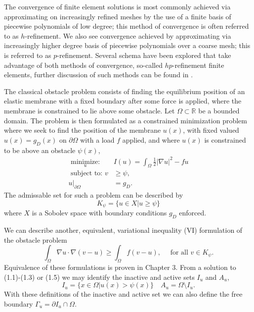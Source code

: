 \documentclass[12 pt]{report}
\newcommand{\RR}{\mathbb{R}}
\newcommand{\abs}[1]{\left| #1 \right|}
\begin{document}
The convergence of finite element solutions is most commonly achieved via approximating on increasingly refined meshes by the use of a finite basis of piecewise polynomials of low degree; this method of convergence is often referred to as $h$-refinement. We also see convergence achieved by approximating via increasingly higher degree basis of piecewise polynomials over a coarse mesh; this is referred to as $p$-refinement. Several schema have been explored that take advantage of both methods of convergence, so-called $hp$-refinement finite elements, further discussion of such methods can be found in \citet{demkowicz_computing_2007}.


The classical obstacle problem consists of finding the equilibrium position of an elastic membrane with a fixed boundary after some force is applied, where the membrane is constrained to lie above some obstacle. Let $\Omega \subset \RR$ be a bounded domain. The problem is then formulated as a constrained minimization problem where we seek to find the position of the membrane $u(x)$, with fixed valued $u(x) = g_D(x)$ on $\partial \Omega$ with a load $f$ applied, and where $u(x)$ is constrained to be above an obstacle $\psi(x)$, 
\begin{align}
    \underset{u}{\text{ minimize: }}  &I(u) = \int_\Omega \frac{1}{2} \abs{\nabla u}^2 - fu \\
  \text{ subject to: } v &\geq \psi, \\
    u |_{\partial\Omega} &= g_D. 
  \end{align}
  The admissable set for such a problem can be described by 
  \begin{equation}
    K_\psi = \{u \in X| u \geq \psi \}
  \end{equation}
  where $X$ is a Sobolev space with boundary conditions $g_D$ enforced. 
  
  We can describe another, equivalent, variational inequality (VI) formulation of the obstacle problem 
  \begin{equation}
    \int_\Omega \nabla u \cdot \nabla(v - u) \geq \int_\Omega f(v - u), \quad \text{ for all } v \in K_\psi.
  \end{equation} 
  Equivalence of these formulations is proven in Chapter 3. From a solution to (1.1)-(1.3) or (1.5) we may identify the inactive and active sets $I_u$ and $A_u$,
\begin{equation}
  I_u = \{x \in \Omega | u(x) > \psi(x)\} \quad A_u = \Omega \setminus I_u.
\end{equation} 
With these definitions of the inactive and active set we can also define the free boundary $\Gamma_u = \partial I_u \cap \Omega$.
\end{document}
